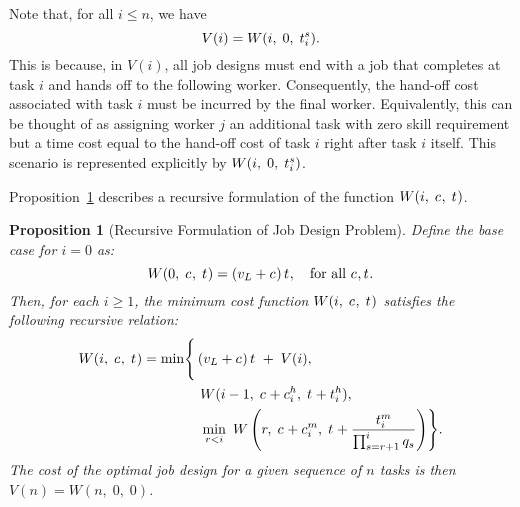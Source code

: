 \documentclass{article}
\theoremstyle{plain}
\theoremstyle{plain}
\newtheorem{definition}{Definition}
\newtheorem{proposition}{Proposition}
\begin{document}
Note that, for all $i \leq n$, we have 
\[ V(i) = W(i,\; 0,\; t^{s}_{i}). \]
This is because, in $V(i)$, all job designs must end with a job that completes at task $i$ and hands off to the following worker.  
Consequently, the hand-off cost associated with task $i$ must be incurred by the final worker.
Equivalently, this can be thought of as assigning worker $j$ an additional task with zero skill requirement but a time cost equal to the hand-off cost of task $i$ right after task $i$ itself.
This scenario is represented explicitly by $W(i,\; 0,\; t^{s}_{i})$.

Proposition~\ref{prop:recursive_optimality} describes a recursive formulation of the function $W(i,\; c_{},\; t_{})$.

\begin{proposition}[Recursive Formulation of Job Design Problem]
\label{prop:recursive_optimality}
Define the base case for $i=0$ as:
\[
W(0,\; c_{},\; t_{}) 
= 
\left(v_L + c_{}\right) t_{}, 
\quad
\text{for all $c_{}, t_{}$}.
\]
Then, for each $i \geq 1$, the minimum cost function $W(i,\; c_{},\; t_{})$ satisfies the following recursive relation:
\begin{align*}
W(i,\; c_{},\; t_{})
= \min\Biggl\{ 
& \left(v_L + c_{}\right) t_{} \; + \; V(i), \\
& \ W(i-1,\; c_{} + c^{h}_{i},\; t_{} + t^{h}_{i}), \\
& \ \min_{r < i} \ W\left(r,\; c_{} + c^{m}_{i},\; t_{} + \frac{t^{m}_{i}}{\prod_{s=r+1}^{i} q_s}\right)
\Biggr\}.
\end{align*}
The cost of the optimal job design for a given sequence of $n$ tasks is then $V(n) = W(n,\; 0,\; 0)$.
\end{proposition}
\end{document}
